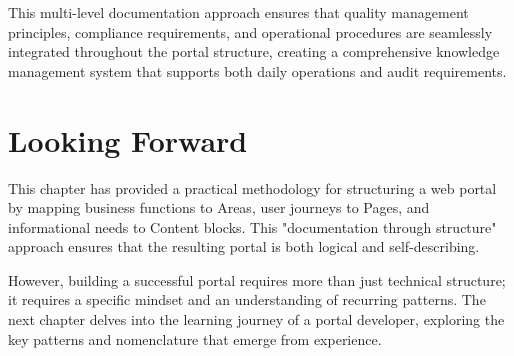 This multi-level documentation approach ensures that quality management principles, compliance requirements, and operational procedures are seamlessly integrated throughout the portal structure, creating a comprehensive knowledge management system that supports both daily operations and audit requirements.

\section{Looking Forward}
\label{sec:portal-structure-forward}

This chapter has provided a practical methodology for structuring a web portal by mapping business functions to Areas, user journeys to Pages, and informational needs to Content blocks. This "documentation through structure" approach ensures that the resulting portal is both logical and self-describing.

However, building a successful portal requires more than just technical structure; it requires a specific mindset and an understanding of recurring patterns. The next chapter delves into the learning journey of a portal developer, exploring the key patterns and nomenclature that emerge from experience.
